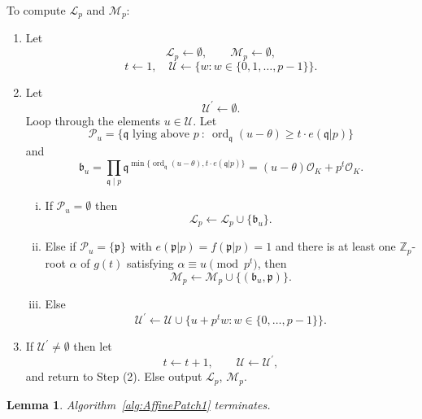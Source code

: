 \documentclass[11pt]{report}
\newtheorem{lemma}[theorem]{Lemma}
\theoremstyle{definition}
\DeclareMathOperator{\ord}{ord}
\begin{document}
\begin{algorithm} \label{alg:AffinePatch1}
To compute
$\mathcal{L}_p$ and $\mathcal{M}_p$:

\begin{enumerate}[Step (1)]
\item Let
\[\mathcal{L}_p \leftarrow \emptyset, \qquad \mathcal{M}_p \leftarrow \emptyset,\]
\[ t \leftarrow 1, \quad \mathcal{U} \leftarrow \{w : w \in \{0,1,\dots,p-1\} \}.\]
\item Let
\[\mathcal{U}^\prime \leftarrow \emptyset.\]
Loop through the elements $u \in \mathcal{U}$. Let
\[\mathcal{P}_u= \{\mathfrak{q} \text{ lying above } p \ : \ \ord_{\mathfrak{q}}(u-\theta) \geq t \cdot e(\mathfrak{q}|p)\}\]
and
\[ \mathfrak{b}_u 	= \prod_{\mathfrak{q} \mid p} \mathfrak{q}^{\min\{\ord_\mathfrak{q}(u-\theta), t \cdot e(\mathfrak{q}|p)\}}
				= (u-\theta) \mathcal{O}_K+p^t \mathcal{O}_K.\]
\begin{enumerate}[(i)]
\item If $\mathcal{P}_u = \emptyset$ then
\[\mathcal{L}_p \leftarrow \mathcal{L}_p \cup \{\mathfrak{b}_u\}.\]
\item Else if $\mathcal{P}_u = \{\mathfrak{p}\}$ with $e(\mathfrak{p}|p)=f(\mathfrak{p}|p)=1$ and there is at least one $\mathbb{Z}_p$-root $\alpha$ of $g(t)$ satisfying $\alpha \equiv u \pmod{p^t}$, then
\[\mathcal{M}_p \leftarrow \mathcal{M}_p \cup \{ (\mathfrak{b}_u,\mathfrak{p})\}.\]
\item Else
\[\mathcal{U}^\prime \leftarrow \mathcal{U} \cup \{ u+p^{t}w : w \in \{0,\dots,p-1\} \}.\]
\end{enumerate}

\item If $\mathcal{U}^\prime \ne \emptyset$ then let
\[t \leftarrow t+1, \qquad \mathcal{U} \leftarrow \mathcal{U}^{\prime},\]
and return to Step (2). Else output $\mathcal{L}_p$, $\mathcal{M}_p$.
\end{enumerate}
\end{algorithm}

\begin{lemma}
Algorithm~\ref{alg:AffinePatch1} terminates.
\end{lemma}
\end{document}
